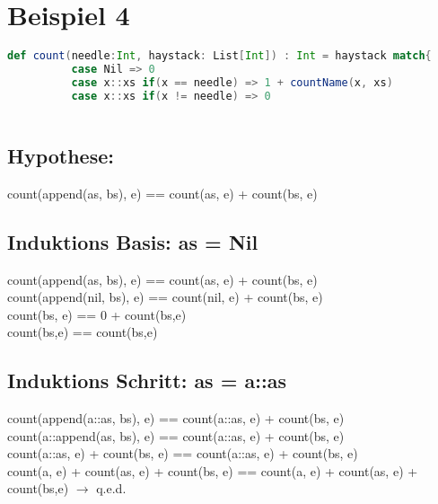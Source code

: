 \documentclass[12pt,runningheads,a4paper]{llncs}
\begin{document}
\section*{Beispiel 4}
\begin{lstlisting}[language=scala]
    def count(needle:Int, haystack: List[Int]) : Int = haystack match{
          case Nil => 0
          case x::xs if(x == needle) => 1 + countName(x, xs)
          case x::xs if(x != needle) => 0
 
\end{lstlisting}

\subsection*{Hypothese:}
count(append(as, bs), e) == count(as, e) + count(bs, e)
\subsection*{Induktions Basis:   as = Nil}
count(append(as, bs), e) == count(as, e) + count(bs, e)\\
count(append(nil, bs), e) == count(nil, e) + count(bs, e)\\
count(bs, e) == 0 + count(bs,e)\\
count(bs,e) == count(bs,e)


\subsection*{Induktions Schritt:   as = a::as}
count(append(a::as, bs), e) == count(a::as, e) + count(bs, e)\\
count(a::append(as, bs), e) == count(a::as, e) + count(bs, e)\\
count(a::as, e) + count(bs, e) == count(a::as, e) + count(bs, e)\\ 
count(a, e) + count(as, e) + count(bs, e) == count(a, e) + count(as, e) + count(bs,e) $\rightarrow$ q.e.d.
\end{document}
